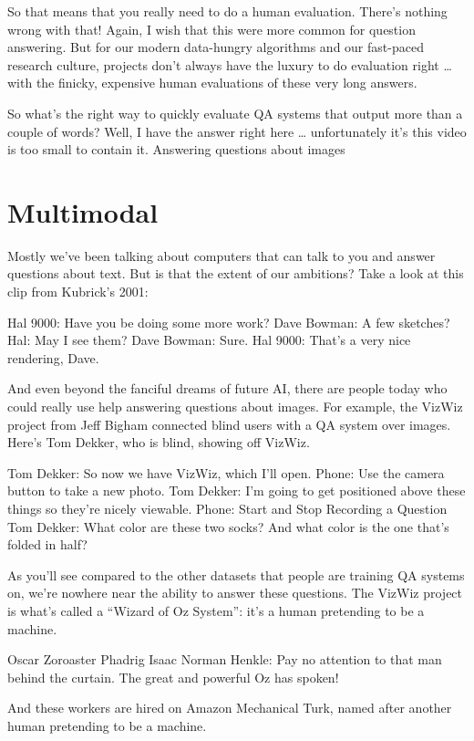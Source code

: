 So that means that you really need to do a human evaluation.  There’s nothing wrong with that!  Again, I wish that this were more common for question answering.  But for our modern data-hungry algorithms and our fast-paced research culture, projects don’t always have the luxury to do evaluation right … with the finicky, expensive human evaluations of these very long answers.

So what’s the right way to quickly evaluate QA systems that output more than a couple of words?  Well, I have the answer right here … unfortunately it’s this video is too small to contain it.
Answering questions about images

\section{Multimodal}
\label{sec:formats:multimodal}

Mostly we’ve been talking about computers that can talk to you and answer questions about text.  But is that the extent of our ambitions?  Take a look at this clip from Kubrick’s 2001:

Hal 9000: Have you be doing some more work?
Dave Bowman: A few sketches?
Hal: May I see them?
Dave Bowman: Sure.
Hal 9000: That’s a very nice rendering, Dave.

And even beyond the fanciful dreams of future AI, there are people today who could really use help answering questions about images.  For example, the VizWiz project from Jeff Bigham connected blind users with a QA system over images.  Here’s Tom Dekker, who is blind, showing off VizWiz.

Tom Dekker: So now we have VizWiz, which I’ll open.
Phone: Use the camera button to take a new photo.
Tom Dekker: I’m going to get positioned above these things so they’re nicely viewable.
Phone: Start and Stop Recording a Question
Tom Dekker: What color are these two socks?  And what color is the one that’s folded in half?

As you’ll see compared to the other datasets that people are training QA systems on, we’re nowhere near the ability to answer these questions.  The VizWiz project is what’s called a “Wizard of Oz System”: it’s a human pretending to be a machine.

Oscar Zoroaster Phadrig Isaac Norman Henkle: Pay no attention to that man behind the curtain.  The great and powerful Oz has spoken!

And these workers are hired on Amazon Mechanical Turk, named after another human pretending to be a machine.

